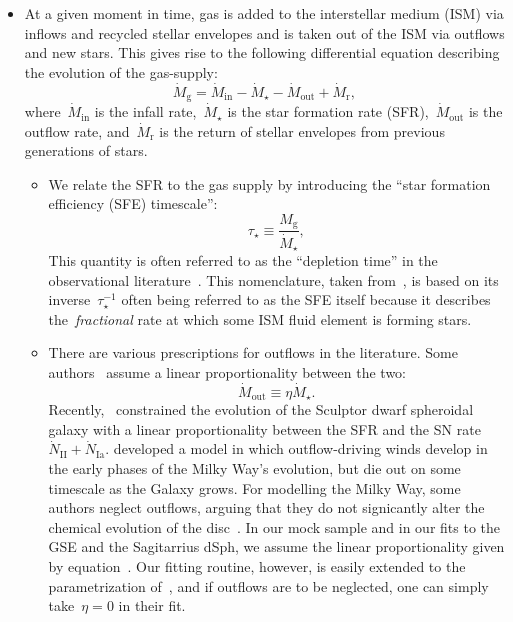 \documentclass[ms.tex]{subfiles}
\begin{document}
\begin{itemize}

	\item At a given moment in time, gas is added to the interstellar medium
	(ISM) via inflows and recycled stellar envelopes and is taken out of the
	ISM via outflows and new stars.
	This gives rise to the following differential equation describing the
	evolution of the gas-supply:
	\begin{equation}
	\label{eq:mdot_gas}
	\dot{M}_\text{g} = \dot{M}_\text{in} - \dot{M}_\star - \dot{M}_\text{out}
	+ \dot{M}_\text{r},
	\end{equation}
	where~$\dot{M}_\text{in}$ is the infall rate,~$\dot{M}_\star$ is the star
	formation rate (SFR),~$\dot{M}_\text{out}$ is the outflow rate,
	and~$\dot{M}_\text{r}$ is the return of stellar envelopes from previous
	generations of stars.

	\begin{itemize}
		\item We relate the SFR to the gas supply by introducing the ``star
		formation efficiency (SFE) timescale'':
		\begin{equation}
		\tau_\star \equiv \frac{M_\text{g}}{\dot{M}_\star},
		\end{equation}
		This quantity is often referred to as the ``depletion time'' in the
		observational literature~\citep[e.g.][]{Tacconi2018}.
		This nomenclature, taken from~\citet{Weinberg2017}, is based on its
		inverse~$\tau_\star^{-1}$ often being referred to as the SFE itself
		because it describes the~\textit{fractional} rate at which some ISM
		fluid element is forming stars.

		\item There are various prescriptions for outflows in the literature.
		Some authors~\citep[e.g.][]{Andrews2017, Weinberg2017} assume a linear
		proportionality between the two:
		\begin{equation}
		\label{eq:eta}
		\dot{M}_\text{out} \equiv \eta\dot{M}_\star.
		\end{equation}
		Recently,~\citet{delosReyes2022} constrained the evolution of the
		Sculptor dwarf spheroidal galaxy with a linear proportionality between
		the SFR and the SN rate~$\dot{N}_\text{II} + \dot{N}_\text{Ia}$.
		\citet*{Kobayashi2020} developed a model in which outflow-driving winds
		develop in the early phases of the Milky Way's evolution, but die out
		on some timescale as the Galaxy grows.
		For modelling the Milky Way, some authors neglect outflows, arguing
		that they do not signicantly alter the chemical evolution of the
		disc~\citep[e.g.][]{Spitoni2019, Spitoni2021}.
		In our mock sample and in our fits to the GSE and the Sagitarrius dSph,
		we assume the linear proportionality given by equation~.
		Our fitting routine, however, is easily extended to the parametrization
		of~\citet{delosReyes2022}, and if outflows are to be neglected, one can
		simply take~$\eta = 0$ in their fit.


\end{itemize}
\end{itemize}
\end{document}
